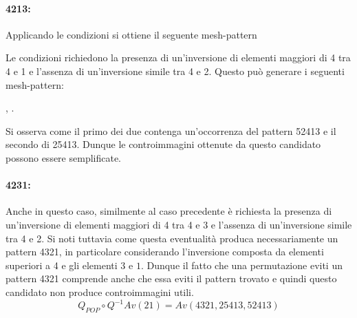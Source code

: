 \paragraph*{4213:} Applicando le condizioni si ottiene il seguente mesh-pattern
\begin{center}
\end{center}
Le condizioni richiedono la presenza di un'inversione di elementi maggiori di 4 tra 4 e 1 e l'assenza di un'inversione simile tra 4 e 2. Questo pu\`o generare i seguenti mesh-pattern:
\begin{center}
,
.
\end{center} 
Si osserva come il primo dei due contenga un'occorrenza del pattern 52413 e il secondo di 25413. Dunque le controimmagini ottenute da questo candidato possono essere semplificate.
\paragraph*{4231:} Anche in questo caso, similmente al caso precedente \`e richiesta la presenza di un'inversione di elementi maggiori di 4 tra 4 e 3 e l'assenza di un'inversione simile tra 4 e 2. Si noti tuttavia come questa eventualit\`a produca necessariamente un pattern 4321, in particolare considerando l'inversione composta da elementi superiori a 4 e gli elementi $3$ e $1$. Dunque il fatto che una permutazione eviti un pattern 4321 comprende anche che essa eviti il pattern trovato e quindi questo candidato non produce controimmagini utili. 
$$Q_{POP}\circ Q^{-1}Av(21) = Av(4321, 25413, 52413)$$
